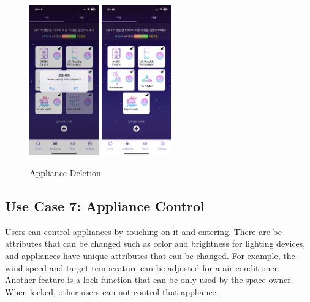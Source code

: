 \documentclass[conference]{IEEEtran}
\begin{document}
        \begin{figure}[htbp]
            \centerline{\includegraphics[width=3cm]{Images/screen/light/6_LIGHT_DELETE.PNG}
            \includegraphics[width=3cm]{Images/screen/light/7_LIGHT_DELETE_COMPLETE.PNG}}
            \caption{Appliance Deletion}
            \label{fig}
        \end{figure}
    \subsection{Use Case 7: Appliance Control}
        Users can control appliances by touching on it and entering. There are be attributes that can be changed such as color and brightness for lighting devices, and appliances have unique attributes that can be changed. For example, the wind speed and target temperature can be adjusted for a air conditioner.\\
        Another feature is a lock function that can be only used by the space owner. When locked, other users can not control that appliance.\\
\end{document}

